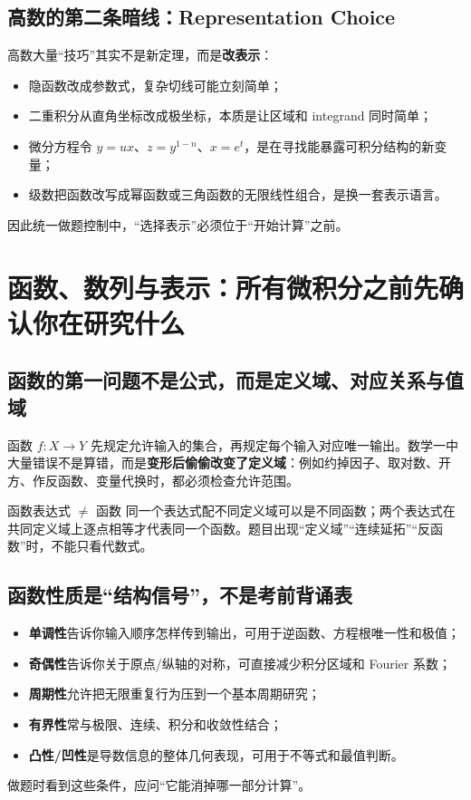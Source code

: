 \documentclass[11pt,a4paper,openany]{ctexbook}
\newcommand{\key}[1]{\textbf{\color{deep}#1}}
\begin{document}
\section{高数的第二条暗线：Representation Choice}
高数大量“技巧”其实不是新定理，而是\key{改表示}：
\begin{itemize}
  \item 隐函数改成参数式，复杂切线可能立刻简单；
  \item 二重积分从直角坐标改成极坐标，本质是让区域和 integrand 同时简单；
  \item 微分方程令 $y=ux$、$z=y^{1-n}$、$x=e^t$，是在寻找能暴露可积分结构的新变量；
  \item 级数把函数改写成幂函数或三角函数的无限线性组合，是换一套表示语言。
\end{itemize}
因此统一做题控制中，“选择表示”必须位于“开始计算”之前。

\chapter{函数、数列与表示：所有微积分之前先确认你在研究什么}

\section{函数的第一问题不是公式，而是定义域、对应关系与值域}
函数 $f:X\to Y$ 先规定允许输入的集合，再规定每个输入对应唯一输出。数学一中大量错误不是算错，而是\key{变形后偷偷改变了定义域}：例如约掉因子、取对数、开方、作反函数、变量代换时，都必须检查允许范围。

\begin{boundarybox}{函数表达式 $\neq$ 函数}
同一个表达式配不同定义域可以是不同函数；两个表达式在共同定义域上逐点相等才代表同一个函数。题目出现“定义域”“连续延拓”“反函数”时，不能只看代数式。
\end{boundarybox}

\section{函数性质是“结构信号”，不是考前背诵表}
\begin{itemize}
  \item \key{单调性}告诉你输入顺序怎样传到输出，可用于逆函数、方程根唯一性和极值；
  \item \key{奇偶性}告诉你关于原点/纵轴的对称，可直接减少积分区域和 Fourier 系数；
  \item \key{周期性}允许把无限重复行为压到一个基本周期研究；
  \item \key{有界性}常与极限、连续、积分和收敛性结合；
  \item \key{凸性/凹性}是导数信息的整体几何表现，可用于不等式和最值判断。
\end{itemize}
做题时看到这些条件，应问“它能消掉哪一部分计算”。
\end{document}
